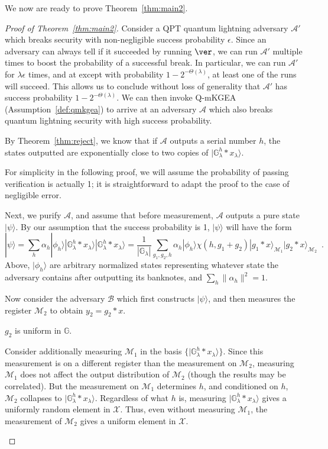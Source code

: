 \documentclass{article}\usepackage[a4paper,margin=20mm]{geometry}
\numberwithin{theorem}{section}
\numberwithin{equation}{section}
\newcommand{\G}{\mathbb{G}}
\newcommand{\As}{{\mathcal{A}}}
\newcommand{\Bs}{{\mathcal{B}}}
\newcommand{\Ms}{{\mathcal{M}}}
\newcommand{\Xs}{{\mathcal{X}}}
\begin{document}
\noindent We now are ready to prove Theorem~\ref{thm:main2}.

\begin{proof}[Proof of Theorem~\ref{thm:main2}]Consider a QPT quantum lightning adversary $\As'$ which breaks security with non-negligible success probability $\epsilon$. Since an adversary can always tell if it succeeded by running $\ver$, we can run $\As'$ multiple times to boost the probability of a successful break. In particular, we can run $\As'$ for $\lambda\epsilon$ times, and at except with probability $1-2^{-\Theta(\lambda)}$, at least one of the runs will succeed. This allows us to conclude without loss of generality that $\As'$ has success probability $1-2^{-\Theta(\lambda)}$. We can then invoke Q-mKGEA (Assumption~\ref{def:qmkgea}) to arrive at an adversary $\As$ which also breaks quantum lightning security with high success probability.
	
	
	By Theorem~\ref{thm:reject}, we know that if $\As$ outputs a serial number $h$, the states outputted are exponentially close to two copies of $|\G_\lambda^h*x_\lambda\rangle$.
	
	For simplicity in the following proof, we will assume the probability of passing verification is actually 1; it is straightforward to adapt the proof to the case of negligible error.
	
	Next, we purify $\As$, and assume that before measurement, $\As$ outputs a pure state $|\psi\rangle$. By our assumption that the success probability is 1, $|\psi\rangle$ will have the form
	\[|\psi\rangle=\sum_{h}\alpha_h|\phi_h\rangle|\G_\lambda^h*x_\lambda\rangle|\G_\lambda^h*x_\lambda\rangle=\frac{1}{|\G_\lambda|}\sum_{g_1,g_2,h}\alpha_h|\phi_h\rangle\chi(h,g_1+g_2)|g_1*x\rangle_{\Ms_1}|g_2*x\rangle_{\Ms_2}\enspace.\]
	Above, $|\phi_h\rangle$ are arbitrary normalized states representing whatever state the adversary contains after outputting its banknotes, and $\sum_h\|\alpha_h\|^2=1$.
	
	Now consider the adversary $\Bs$ which first constructs $|\psi\rangle$, and then measures the register $\Ms_2$ to obtain $y_2=g_2*x$. 
	\begin{claim}$g_2$ is uniform in $\G$.
	\end{claim}
	\begin{subproof}Consider additionally measuring $\Ms_1$ in the basis $\{|\G_\lambda^h*x_\lambda\rangle\}$. Since this measurement is on a different register than the measurement on $\Ms_2$, measuring $\Ms_1$ does not affect the output distribution of $\Ms_2$ (though the results may be correlated). But the measurement on $\Ms_1$ determines $h$, and conditioned on $h$, $\Ms_2$ collapses to $|\G_\lambda^h*x_\lambda\rangle$. Regardless of what $h$ is, measuring $|\G_\lambda^h*x_\lambda\rangle$ gives a uniformly random element in $\Xs$. Thus, even without measuring $\Ms_1$, the measurement of $\Ms_2$ gives a uniform element in $\Xs$.\end{subproof}
	

\end{proof}
\end{document}
